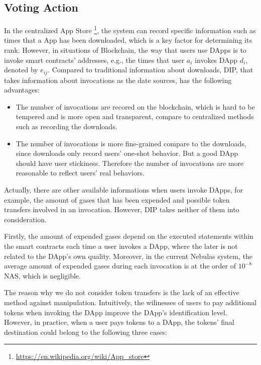  \subsection{Voting Action}
 \label{subsection:voting}
  In the centralized App Store \footnote{\url{https://en.wikipedia.org/wiki/App\_store}}, the system can record specific information such as times that a App has been downloaded, which is a key factor for determining its rank. However, in situations of Blockchain, the way that users use DApps is to invoke smart contracts' addresses, e.g., the times that user $a_i$ invokes DApp $d_i$, denoted by  $e_{ij}$. Compared to traditional information about downloads, DIP, that takes information about invocations as the date sources, has the following advantages:
  
 \begin{itemize}
 	\item The number of invocations are recored on the blockchain, which is hard to be tempered and is more open and transparent, compare to centralized methods such as recording the downloads.
 	\item The number of invocations is more fine-grained compare to the downloads, since downloads only record users' one-shot behavior. But a good DApp should have user stickiness. Therefore the number of invocations are more reasonable to reflect users' real behaviors. 
 	
\end{itemize}
  
 Actually, there are other available informations when users invoke DApps, for example, the amount of gases that has been expended and possible token transfers involved in an invocation. However, DIP takes neither of them into consideration. 
 
 Firstly, the amount of expended gases depend on the executed statements within the smart contracts each time a user invokes a DApp, where the later is not related to the DApp's own quality. Moreover, in the current Nebulas system, the average amount of expended gases during each invocation is at the order of $10^{-8}$ NAS, which is negligible. 
 
 The reason why we do not consider token transfers is the lack of an effective method against manipulation. Intuitively, the wilinesses of users to pay additional tokens when invoking the DApp improve the DApp's {\color{red} identification level}. 
  However, in practice, when a user pays tokens to a DApp, the tokens' final destination could belong to the following three cases:
  
